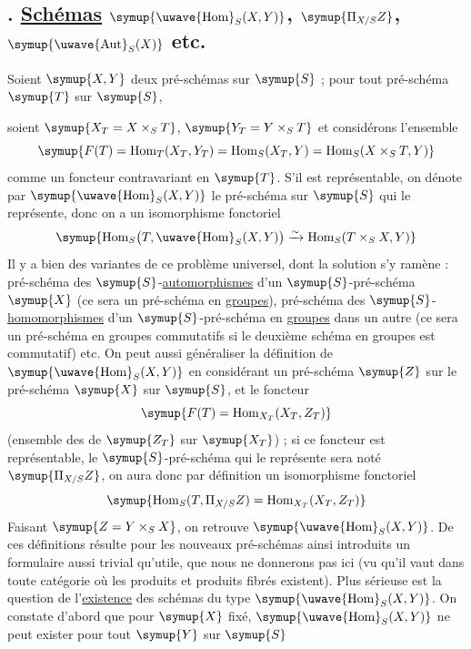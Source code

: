 \subsection*{. \uline{Schémas} $\symup{\text{\uwave{Hom}}_S(X,Y)}$,
$\symup{\Pi_{X/S}Z}$, $\symup{\text{\uwave{Aut}}_S(X)}$ etc.}

Soient $\symup{X,Y}$ deux pré-schémas sur $\symup{S}$ ; pour tout pré-schéma $\symup{T}$ sur $\symup{S}$,

soient $\symup{X_T=X\times_ST}$, $\symup{Y_T=Y\times_ST}$ et considérons l'ensemble
\[
  \symup{F(T)=\operatorname{Hom}_T(X_T,Y_T)
      =\operatorname{Hom}_S(X_T,Y)
      =\operatorname{Hom}_S(X\times_ST,Y)}
\]
comme un foncteur contravariant en $\symup{T}$. S'il est représentable, on dénote par
$\symup{\text{\uwave{Hom}}_S(X,Y)}$ le pré-schéma sur $\symup{S}$ qui le
représente, donc on a un isomorphisme fonctoriel
\[
  \symup{\operatorname{Hom}_S
  \bigl(T,\text{\uwave{Hom}}_S(X,Y)\bigr)
  \xrightarrow{\sim}
  \operatorname{Hom}_S(T\times_SX,Y)}
\]
Il y a bien des variantes de ce problème universel, dont la solution s'y
ramène : pré-schéma des $\symup{S}$-\uline{automorphismes} d'un $\symup{S}$-pré-schéma $\symup{X}$ (ce sera un
pré-schéma en \uline{groupes}), pré-schéma des $\symup{S}$-\uline{homomorphismes} d'un $\symup{S}$-pré-schéma
en \uline{groupes} dans un autre (ce sera un pré-schéma en groupes commutatifs si le
deuxième schéma en groupes est commutatif) etc. On peut aussi généraliser la
définition de $\symup{\text{\uwave{Hom}}_S(X,Y)}$ en considérant un
pré-schéma $\symup{Z}$ sur le pré-schéma $\symup{X}$ sur $\symup{S}$, et le foncteur
\[
  \symup{F(T)=\operatorname{Hom}_{X_T}(X_T,Z_T)}
\]
(ensemble des  de $\symup{Z_T}$ sur $\symup{X_T}$) ; si ce foncteur est
représentable, le $\symup{S}$-pré-schéma qui le représente sera noté $\symup{\Pi_{X/S}Z}$, on
aura donc par définition un isomorphisme fonctoriel
\[
  \symup{\operatorname{Hom}_S(T,\Pi_{X/S}Z)
  =\operatorname{Hom}_{X_T}(X_T,Z_T)}
\]
Faisant $\symup{Z=Y\times_SX}$, on retrouve
$\symup{\text{\uwave{Hom}}_S(X,Y)}$. De ces définitions résulte pour les
nouveaux pré-schémas ainsi introduits un formulaire aussi trivial qu'utile,
que nous ne donnerons pas ici (vu qu'il vaut dans toute catégorie où les
produits et produits fibrés existent). Plus sérieuse est la question de
l'\uline{existence} des schémas du type $\symup{\text{\uwave{Hom}}_S(X,Y)}$. On
constate d'abord que pour $\symup{X}$ fixé,
$\symup{\text{\uwave{Hom}}_S(X,Y)}$ ne peut exister pour tout $\symup{Y}$ sur $\symup{S}$
